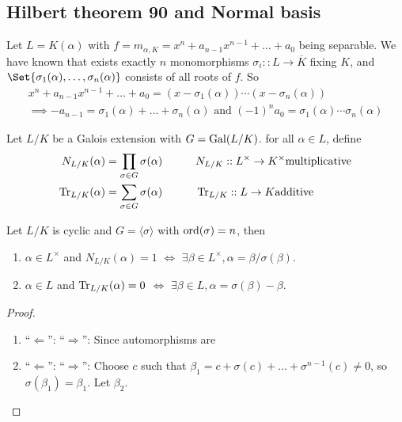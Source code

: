 \subsection{Hilbert theorem 90 and Normal basis}

Let $L = K(\alpha)$ with $f = m_{\alpha, K} = x^n + a_{n-1} x^{n-1} + \dots + a_0$ being separable.
We have known that exists exactly $n$ monomorphisms $\sigma_i :: L \to \overline{K}$ fixing $K$,
and $\Set{\sigma_1(\alpha), \dots, \sigma_n(\alpha)}$ consists of all roots of $f$.
So
\begin{multline*}
  x^n + a_{n-1} x^{n-1} + \dots + a_0 = (x - \sigma_1(\alpha)) \dotsm (x - \sigma_n(\alpha)) \\
  \implies -a_{n-1} = \sigma_1(\alpha) + \dots + \sigma_n(\alpha) \text{ and }
  (-1)^n a_0 = \sigma_1(\alpha) \dotsm \sigma_n(\alpha)
\end{multline*}

\begin{definition}
  Let $L/K$ be a Galois extension with $G = \operatorname{Gal}(L/K)$.
  for all $\alpha \in L$, define 
  \begin{alignat*}
    N_{L/K}(\alpha) &= \prod_{\sigma \in G} \sigma(\alpha) \quad\quad && N_{L/K} :: L^\times \to K^\times \text{multiplicative} \\
    \trace_{L/K}(\alpha) &= \sum_{\sigma \in G} \sigma(\alpha) \quad\quad && \trace_{L/K} :: L \to K \text{additive}
  \end{alignat*}
\end{definition}

\begin{theorem}
  Let $L/K$ is cyclic and $G = \langle \sigma \rangle$ with $\operatorname{ord}(\sigma) = n$, then
  \begin{enumerate}
    \item $\alpha \in L^\times$ and $N_{L/K}(\alpha) = 1$ $\iff$ $\exists \beta \in L^\times, \alpha = \beta / \sigma(\beta)$.
    \item $\alpha \in L$ and $\operatorname{Tr}_{L/K}(\alpha) = 0$ $\iff$ $\exists \beta \in L, \alpha = \sigma(\beta) - \beta$.
  \end{enumerate}

  \begin{proof}
    \begin{enumerate}
      \item ``$\Leftarrow$'': 
      ``$\Rightarrow$'':  Since automorphisms are 
      \item ``$\Leftarrow$'': 
        ``$\Rightarrow$'':  Choose $c$ such that $\beta_1 = c + \sigma(c) + \dots + \sigma^{n-1}(c) \neq 0$, so $\sigma(\beta_1) = \beta_1$.
        Let $\beta_2$.
    \end{enumerate}
  \end{proof}
\end{theorem}

